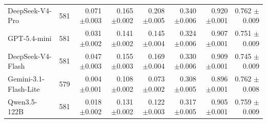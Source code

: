 \begin{table}[t]
\begin{tabular*}{\textwidth}{@{\extracolsep{\fill}}lrrrrrrr@{}}
DeepSeek-V4-Pro & 581 & \shortstack[r]{0.071\\{\scriptsize $\pm$0.003}} & \shortstack[r]{0.165\\{\scriptsize $\pm$0.002}} & \shortstack[r]{0.208\\{\scriptsize $\pm$0.005}} & \shortstack[r]{0.340\\{\scriptsize $\pm$0.006}} & \shortstack[r]{0.920\\{\scriptsize $\pm$0.001}} & \shortstack[r]{0.762\\{\scriptsize $\pm$0.009}} \\
GPT-5.4-mini & 581 & \shortstack[r]{0.031\\{\scriptsize $\pm$0.002}} & \shortstack[r]{0.141\\{\scriptsize $\pm$0.002}} & \shortstack[r]{0.145\\{\scriptsize $\pm$0.004}} & \shortstack[r]{0.324\\{\scriptsize $\pm$0.006}} & \shortstack[r]{0.907\\{\scriptsize $\pm$0.001}} & \shortstack[r]{0.751\\{\scriptsize $\pm$0.009}} \\
DeepSeek-V4-Flash & 581 & \shortstack[r]{0.047\\{\scriptsize $\pm$0.003}} & \shortstack[r]{0.155\\{\scriptsize $\pm$0.003}} & \shortstack[r]{0.169\\{\scriptsize $\pm$0.004}} & \shortstack[r]{0.330\\{\scriptsize $\pm$0.006}} & \shortstack[r]{0.909\\{\scriptsize $\pm$0.001}} & \shortstack[r]{0.745\\{\scriptsize $\pm$0.009}} \\
Gemini-3.1-Flash-Lite & 579 & \shortstack[r]{0.004\\{\scriptsize $\pm$0.001}} & \shortstack[r]{0.108\\{\scriptsize $\pm$0.002}} & \shortstack[r]{0.073\\{\scriptsize $\pm$0.002}} & \shortstack[r]{0.308\\{\scriptsize $\pm$0.005}} & \shortstack[r]{0.896\\{\scriptsize $\pm$0.001}} & \shortstack[r]{0.762\\{\scriptsize $\pm$0.008}} \\
Qwen3.5-122B & 581 & \shortstack[r]{0.018\\{\scriptsize $\pm$0.002}} & \shortstack[r]{0.131\\{\scriptsize $\pm$0.002}} & \shortstack[r]{0.122\\{\scriptsize $\pm$0.003}} & \shortstack[r]{0.317\\{\scriptsize $\pm$0.005}} & \shortstack[r]{0.905\\{\scriptsize $\pm$0.001}} & \shortstack[r]{0.759\\{\scriptsize $\pm$0.009}} \\

\end{tabular*}
\end{table}
